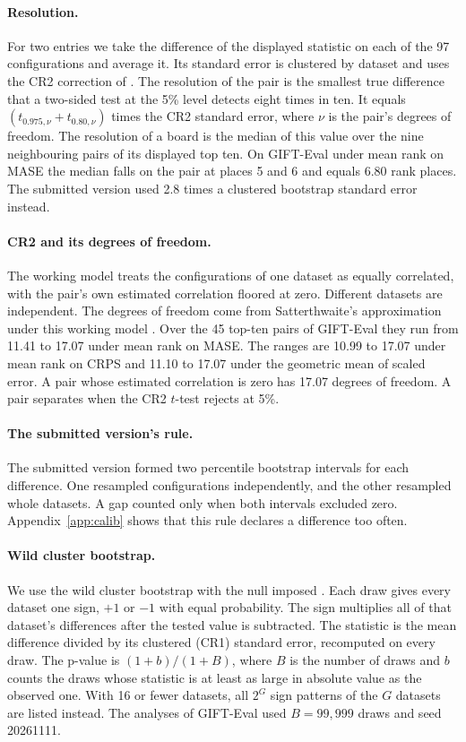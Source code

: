\documentclass{article}
\begin{document}
\paragraph{Resolution.} For two entries we take the difference of the displayed statistic on
each of the 97 configurations and average it. Its standard error is clustered by dataset and
uses the CR2 correction of \citet{bellmccaffrey2002}. The resolution of the pair is the
smallest true difference that a two-sided test at the 5\% level detects eight times in ten.
It equals $(t_{0.975,\nu}+t_{0.80,\nu})$ times the CR2 standard error, where $\nu$ is the
pair's degrees of freedom. The resolution of a board is the median of this value over the
nine neighbouring pairs of its displayed top ten. On GIFT-Eval under mean rank on MASE the
median falls on the pair at places 5 and 6 and equals 6.80 rank places. The submitted version
used 2.8 times a clustered bootstrap standard error instead.

\paragraph{CR2 and its degrees of freedom.} The working model treats the configurations of
one dataset as equally correlated, with the pair's own estimated correlation floored at zero.
Different datasets are independent. The degrees of freedom come from Satterthwaite's
approximation under this working model \citep{bellmccaffrey2002,imbenskolesar2016}. Over the
45 top-ten pairs of GIFT-Eval they run from 11.41 to 17.07 under mean rank on MASE. The
ranges are 10.99 to 17.07 under mean rank on CRPS and 11.10 to 17.07 under the geometric mean
of scaled error. A pair whose estimated correlation is zero has 17.07 degrees of freedom. A
pair separates when the CR2 $t$-test rejects at 5\%.

\paragraph{The submitted version's rule.} The submitted version formed two percentile
bootstrap intervals for each difference. One resampled configurations independently, and the
other resampled whole datasets. A gap counted only when both intervals excluded zero.
Appendix~\ref{app:calib} shows that this rule declares a difference too often.

\paragraph{Wild cluster bootstrap.} We use the wild cluster bootstrap with the null imposed
\citep{cameron2008}. Each draw gives every dataset one sign, $+1$ or $-1$ with equal
probability. The sign multiplies all of that dataset's differences after the tested value is
subtracted. The statistic is the mean difference divided by its clustered (CR1) standard
error, recomputed on every draw. The p-value is $(1+b)/(1+B)$, where $B$ is the number of
draws and $b$ counts the draws whose statistic is at least as large in absolute value as the
observed one. With 16 or fewer datasets, all $2^G$ sign patterns of the $G$ datasets are
listed instead. The analyses of GIFT-Eval used $B = 99{,}999$ draws and seed 20261111.
\end{document}
